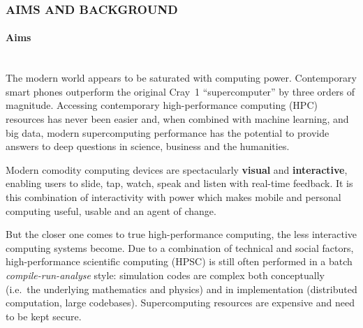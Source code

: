 \documentclass[a4paper,fontsize=12pt]{scrartcl}
\begin{document}

\subsubsection*{AIMS AND BACKGROUND}
\label{SWfMS-grant}
\paragraph*{Aims}\mbox{}\\

The modern world appears to be saturated with computing power.
Contemporary smart phones outperform the original Cray~1
``supercomputer'' by three orders of magnitude. Accessing contemporary
high-performance computing (HPC) resources has never been easier and,
when combined with machine learning\parencite{Hastie2009}, and big
data\parencite{Manyika2011}, modern supercomputing performance has the
potential to provide answers to deep questions in science, business
and the humanities.

Modern comodity computing devices are spectacularly \textbf{visual}
and \textbf{interactive}, enabling users to slide, tap, watch, speak
and listen with real-time feedback. It is this combination of
interactivity with power which makes mobile and personal computing
useful, usable and an agent of change.

But the closer one comes to true high-performance computing, the less
interactive computing systems become. Due to a combination of
technical and social factors, high-performance scientific computing
(HPSC) is still often performed in a batch \emph{compile-run-analyse}
style: simulation codes are complex both conceptually (i.e.~the
underlying mathematics and physics) and in implementation (distributed
computation, large codebases). Supercomputing resources are expensive
and need to be kept secure.
\end{document}
